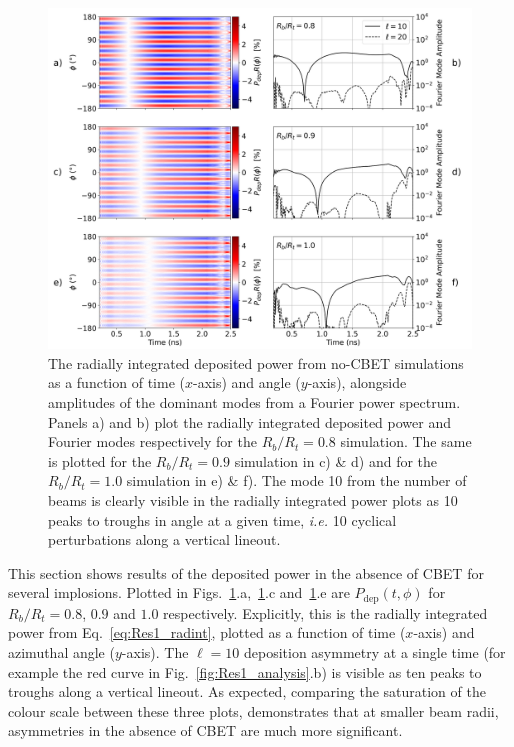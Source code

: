 \begin{figure}[t!]
    \includegraphics[width=\linewidth]{Results1/Images/noCBET_PR_modes.png}
    \centering
    \caption{The radially integrated deposited power from no-\ac{CBET} simulations as a function of time ($x$-axis) and angle ($y$-axis), alongside amplitudes of the dominant modes from a Fourier power spectrum.
    Panels a) and b) plot the radially integrated deposited power and Fourier modes respectively for the $R_b/R_t=0.8$ simulation.
    The same is plotted for the $R_b/R_t=0.9$ simulation in c) \& d) and for the $R_b/R_t=1.0$ simulation in e) \& f).
    The mode 10 from the number of beams is clearly visible in the radially integrated power plots as 10 peaks to troughs in angle at a given time, \textit{i.e.} 10 cyclical perturbations along a vertical lineout.}%
    \label{fig:Res1_PR_noCBET_modes}
\end{figure}

This section shows results of the deposited power in the absence of \ac{CBET} for several implosions.
Plotted in Figs.~\ref{fig:Res1_PR_noCBET_modes}.a,~\ref{fig:Res1_PR_noCBET_modes}.c and~\ref{fig:Res1_PR_noCBET_modes}.e are $P_{\text{dep}}(t,\phi)$ for $R_b/R_t=0.8$, $0.9$ and $1.0$ respectively.
Explicitly, this is the radially integrated power from Eq.~\ref{eq:Res1_radint}, plotted as a function of time ($x$-axis) and azimuthal angle ($y$-axis).
The $\ell=10$ deposition asymmetry at a single time (for example the red curve in Fig.~\ref{fig:Res1_analysis}.b) is visible as ten peaks to troughs along a vertical lineout.
As expected, comparing the saturation of the colour scale between these three plots, demonstrates that at smaller beam radii, asymmetries in the absence of \ac{CBET} are much more significant.

